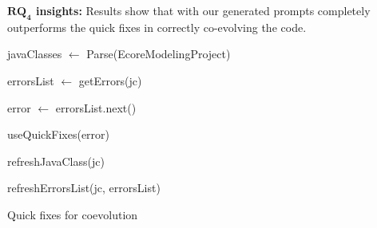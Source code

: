 \begin{tcolorbox}[boxsep=-2pt]
\textbf{$\boldsymbol{RQ_4}$ insights:}
Results show that \LLM with our generated prompts completely outperforms the quick fixes in correctly co-evolving the code. 
\end{tcolorbox}




\begin{algorithm2e}[t]
 \small
\SetAlgoLined
{}
javaClasses $\leftarrow$ Parse(EcoreModelingProject)

{
    errorsList $\leftarrow $ getErrors(jc)
    
    {
        error  $\leftarrow$ errorsList.next()
          
      
        {
        useQuickFixes(error) %
        }
        
                 
        refreshJavaClass(jc) 
                
        refreshErrorsList(jc, errorsList)
    }

}
 
 \caption{Quick fixes for coevolution}
 \label{algo :quickfixes}
\end{algorithm2e}




